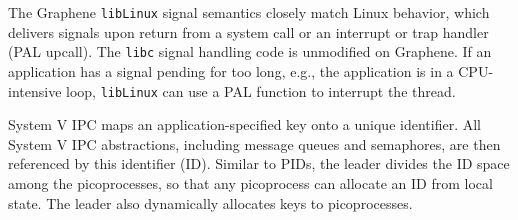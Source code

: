 The Graphene {\tt libLinux} signal semantics closely match Linux behavior, which
delivers signals upon return from a system call or an interrupt or trap handler (PAL upcall).
The {\tt libc} signal handling code is unmodified on Graphene.
If an application has a signal pending for too long,
e.g., the application is in a CPU-intensive loop, {\tt libLinux} can use a PAL function to interrupt 
the thread. 




\begin{comment}
Graphene internally indexes point-to-point handles using PIDs.
In order to facilitate reallocation of PIDs without global coordination, 
Graphene-internal PIDs also include a {\em generation number},
allowing picoprocesses to lazily detect reuse similar to generation numbers 
for inodes in NFS~\citep{sandberg85nfs}.
\end{comment}

\vspace{5pt}
 System V IPC
maps an application-specified key onto a unique identifier.
All System V IPC abstractions, including message queues and semaphores,
are then referenced by this identifier (ID).
Similar to PIDs, 
the leader divides the ID space among the picoprocesses, so that any picoprocess
can allocate an ID from local state. %
The leader also dynamically allocates keys to picoprocesses.

